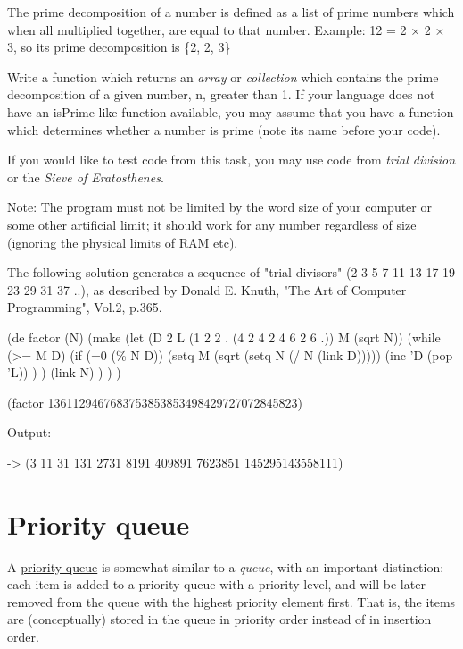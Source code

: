 The prime decomposition of a number is defined as a list of prime
numbers which when all multiplied together, are equal to that number.
Example: 12 = 2 × 2 × 3, so its prime decomposition is \{2, 2, 3\}

Write a function which returns an \emph{array} or \emph{collection}
which contains the prime decomposition of a given number, n, greater
than 1. If your language does not have an isPrime-like function
available, you may assume that you have a function which determines
whether a number is prime (note its name before your code).

If you would like to test code from this task, you may use code from
\emph{trial division} or the \emph{Sieve of Eratosthenes}.

Note: The program must not be limited by the word size of your computer
or some other artificial limit; it should work for any number regardless
of size (ignoring the physical limits of RAM etc).

\begin{wideverbatim}

The following solution generates a sequence of "trial divisors" (2 3 5 7 11 13
17 19 23 29 31 37 ..), as described by Donald E. Knuth, "The Art of Computer
Programming", Vol.2, p.365.

(de factor (N)
   (make
      (let (D 2  L (1 2 2 . (4 2 4 2 4 6 2 6 .))  M (sqrt N))
         (while (>= M D)
            (if (=0 (\% N D))
               (setq M (sqrt (setq N (/ N (link D)))))
               (inc 'D (pop 'L)) ) )
         (link N) ) ) )

(factor 1361129467683753853853498429727072845823)

Output:

-> (3 11 31 131 2731 8191 409891 7623851 145295143558111)

\end{wideverbatim}

\pagebreak{}
\section*{Priority queue}

A \href{http://en.wikipedia.org/wiki/Priority\_queue}{priority queue} is
somewhat similar to a \emph{queue}, with an important
distinction: each item is added to a priority queue with a priority
level, and will be later removed from the queue with the highest
priority element first. That is, the items are (conceptually) stored in
the queue in priority order instead of in insertion order.

